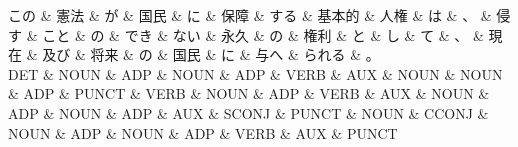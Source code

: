 \documentclass[tikz,border=5pt]{standalone}
\begin{document}
\small
\begin{dependency}[edge unit distance=11.4pt]
    \begin{deptext}[column sep=0.5em]
        この \& 憲法 \& が \& 国民 \& に \& 保障 \& する \& 基本的 \& 人権 \& は \& 、 \& 侵す \& こと \& の \& でき \& ない \& 永久 \& の \& 権利 \& と \& し \& て \& 、 \& 現在 \& 及び \& 将来 \& の \& 国民 \& に \& 与へ \& られる \& 。\\
        DET \& NOUN \& ADP \& NOUN \& ADP \& VERB \& AUX \& NOUN \& NOUN \& ADP \& PUNCT \& VERB \& NOUN \& ADP \& VERB \& AUX \& NOUN \& ADP \& NOUN \& ADP \& AUX \& SCONJ \& PUNCT \& NOUN \& CCONJ \& NOUN \& ADP \& NOUN \& ADP \& VERB \& AUX \& PUNCT\\
    \end{deptext}
\end{dependency}
\end{document}
